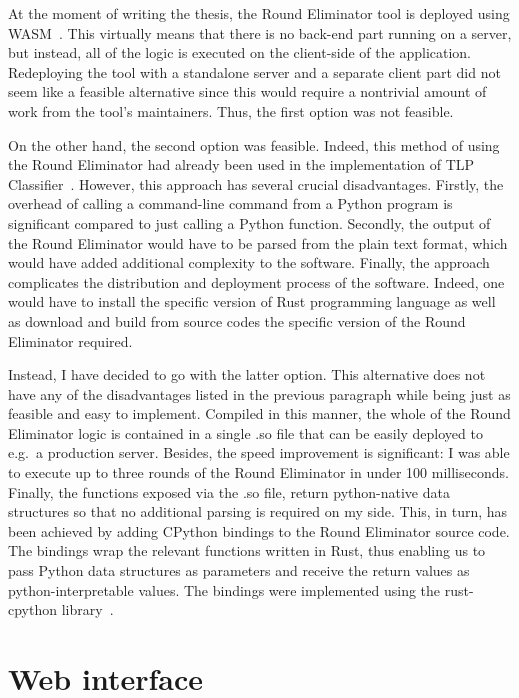 At the moment of writing the thesis, the Round Eliminator tool
is deployed using WASM~\cite{WASM}. This virtually means that
there is no back-end part running on a server, but instead,
all of the logic is executed on the client-side of the application.
Redeploying the tool with a standalone server and a separate client
part did not seem like a feasible alternative since this would
require a nontrivial amount of work from the tool's maintainers.
Thus, the first option was not feasible.

On the other hand, the second option was feasible. Indeed,
this method of using the Round Eliminator had already been used in the
implementation of TLP Classifier~\cite{Rocher2020clas}. However,
this approach has several crucial disadvantages.
Firstly, the overhead of calling a command-line command
from a Python program is significant compared to just calling
a Python function. Secondly, the output of the Round Eliminator
would have to be parsed from the plain text format, which
would have added additional complexity to the software.
Finally, the approach complicates the distribution and
deployment process of
the software. Indeed, one would have to install the specific
version of Rust programming language as well as download and
build from source codes the specific version of the Round Eliminator required.

Instead, I have decided to go with the latter option. This
alternative does not have any of the disadvantages listed
in the previous paragraph while being just as feasible and
easy to implement. Compiled in this manner, the whole of the
Round Eliminator logic is contained in a single .so file
that can be easily deployed to e.g.\ a production server.
Besides, the speed improvement is significant: I was
able to execute up to three rounds of the Round Eliminator
in under 100 milliseconds. Finally, the functions
exposed via the .so file, return python-native
data structures so that no additional parsing is required on my side.
This, in turn, has been achieved by adding CPython bindings
to the Round Eliminator source code. The bindings wrap the relevant functions
written in Rust, thus enabling us to pass Python data structures
as parameters and receive the return values as python-interpretable values.
The bindings were implemented using the rust-cpython library~\cite{RustCPython}.


\section{Web interface}
\label{section:webinterface}

